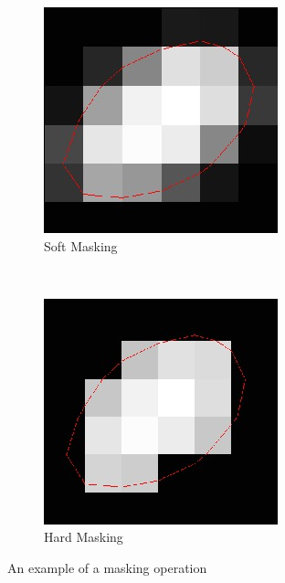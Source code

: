 \documentclass[10pt,journal,compsoc, draftclsnofoot,onecolumn]{IEEEtran}
\begin{document}
\begin{figure}[h!]
\begin{subfigure}[b]{0.15\textwidth}
        \includegraphics[width=\textwidth]{soft_masking.jpg}
        \caption{Soft Masking}
    \end{subfigure}
    ~ %
    \begin{subfigure}[b]{0.15\textwidth}
        \includegraphics[width=\textwidth]{hard_masking.jpg}
        \caption{Hard Masking}
    \end{subfigure}
    \caption{An example of a masking operation}\label{fig:animals}
\end{figure}
\end{document}
